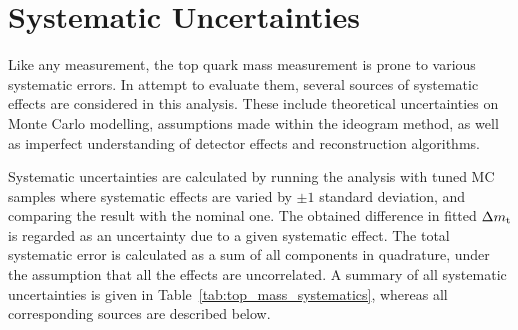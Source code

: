 \section{Systematic Uncertainties}
\label{s_top_mass:systematics}

Like any measurement, the top quark mass measurement is prone to various systematic errors. In attempt to evaluate them,
several sources of systematic effects are considered in this analysis. These include theoretical uncertainties on Monte
Carlo modelling, assumptions made within the ideogram method, as well as imperfect understanding of detector effects and
reconstruction algorithms.

Systematic uncertainties are calculated by running the analysis with tuned MC samples where systematic effects are
varied by $\pm 1$ standard deviation, and comparing the result with the nominal one. The obtained difference in fitted
$\Delta m_\mathrm{t}$ is regarded as an uncertainty due to a given systematic effect. The total systematic error is calculated
as a sum of all components in quadrature, under the assumption that all the effects are uncorrelated. A summary of all
systematic uncertainties is given in Table~\ref{tab:top_mass_systematics}, whereas all corresponding sources are
described below.




